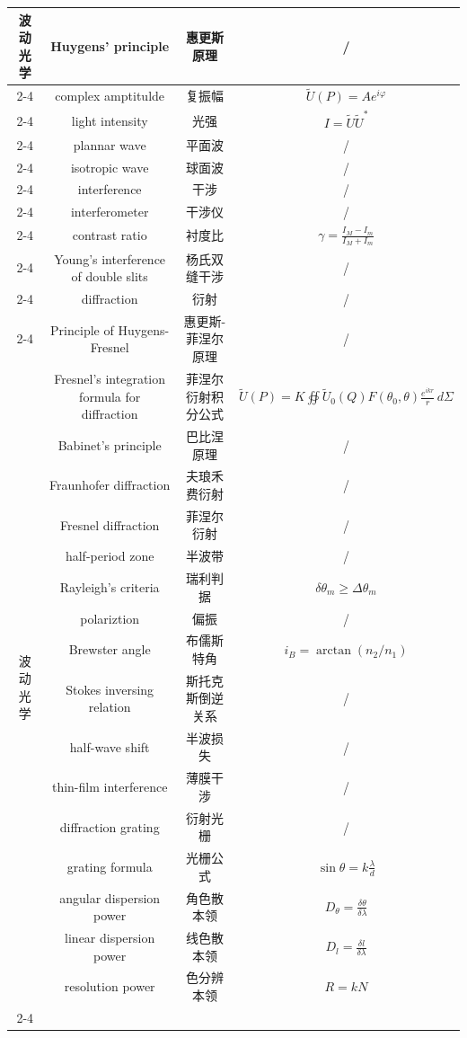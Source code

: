 \documentclass{article}
\begin{document}
\begin{longtable}{|c|c|c|c|}
    \multirow{11}{*}{波动光学}
    & Huygens' principle & 惠更斯原理 & / \\
    \cline{2-4}
    & complex amptitulde & 复振幅 & $\tilde{U}(P)=Ae^{i\varphi}$ \\
    \cline{2-4}
    & light intensity & 光强 & $I=\tilde{U}\tilde{U}^*$ \\
    \cline{2-4}
    & plannar wave & 平面波 & / \\
    \cline{2-4}
    & isotropic wave & 球面波 & / \\
    \cline{2-4}
    & interference & 干涉 & / \\
    \cline{2-4}
    & interferometer & 干涉仪 & / \\
    \cline{2-4}
    & contrast ratio & 衬度比 & $\gamma=\frac{I_M-I_m}{I_M+I_m}$ \\
    \cline{2-4}
    & Young's interference of double slits & 杨氏双缝干涉 & / \\
    \cline{2-4}
    & diffraction & 衍射 & / \\
    \cline{2-4}
    & Principle of Huygens-Fresnel & 惠更斯-菲涅尔原理 & / \\
    \hline
    
    \multirow{16}{*}{波动光学}
    & Fresnel's integration formula for diffraction & 菲涅尔衍射积分公式 & $\tilde{U}(P)=K\oiint \tilde{U}_0(Q)F(\theta_0,\theta)\frac{e^{ikr}}{r}\,d\Sigma$ \\
    \cline{2-4}
    & Babinet's principle & 巴比涅原理 & / \\
    \cline{2-4}
    & Fraunhofer diffraction & 夫琅禾费衍射 & / \\
    \cline{2-4}
    & Fresnel diffraction & 菲涅尔衍射 & / \\
    \cline{2-4}
    & half-period zone & 半波带 & / \\
    \cline{2-4}
    & Rayleigh's criteria & 瑞利判据 & $\delta \theta_m \ge \Delta \theta_m$ \\
    \cline{2-4}
    & polariztion & 偏振 & / \\
    \cline{2-4}
    & Brewster angle & 布儒斯特角 & $i_B=\arctan{(n_2/n_1)}$ \\
    \cline{2-4}
    & Stokes inversing relation & 斯托克斯倒逆关系 & / \\
    \cline{2-4}
    & half-wave shift & 半波损失 & / \\
    \cline{2-4}
    & thin-film interference & 薄膜干涉 & / \\
    \cline{2-4}
    & diffraction grating & 衍射光栅 & / \\
    \cline{2-4}
    & grating formula & 光栅公式 & $\sin{\theta}=k\frac{\lambda}{d}$ \\
    \cline{2-4}
    & angular dispersion power & 角色散本领 & $D_{\theta}=\frac{\delta \theta}{\delta \lambda}$ \\
    \cline{2-4}
    & linear dispersion power & 线色散本领 & $D_{l}=\frac{\delta l}{\delta \lambda}$ \\
    \cline{2-4}
    & resolution power & 色分辨本领 & $R=kN$ \\
    \cline{2-4}
  \end{longtable}
\end{document}
